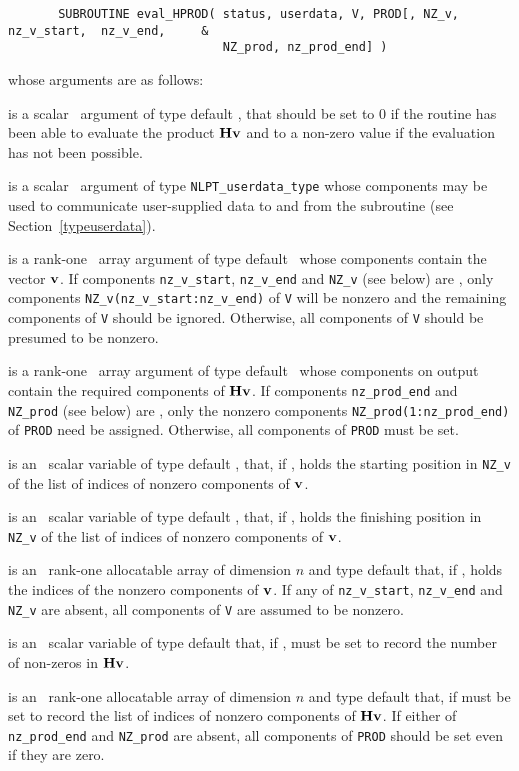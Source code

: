 \documentclass{galahad}
\begin{document}
\def\baselinestretch{0.8}
{\tt \begin{verbatim}
       SUBROUTINE eval_HPROD( status, userdata, V, PROD[, NZ_v, nz_v_start,  nz_v_end,     &
                              NZ_prod, nz_prod_end] )
\end{verbatim} }
\def\baselinestretch{1.0}
\noindent whose arguments are as follows:

\begin{description}
 is a scalar \intentout\ argument of type default \integer,
that should be set to 0 if the routine has been able to evaluate the
product ${\mathbf{H}} {\mathbf{v}}$ 
and to a non-zero value if the evaluation has not been possible.

 is a scalar \intentinout\ argument of type 
{\tt NLPT\_userdata\_type} whose components may be used
to communicate user-supplied data to and from the
subroutine (see Section~\ref{typeuserdata}). 

 is a rank-one \intentin\ array argument of type default \realdp\
whose components contain the vector ${\mathbf{v}}$. 
If components
{\tt nz\_v\_start},
{\tt nz\_v\_end} 
and
{\tt NZ\_v} 
(see below) are \present,
only components {\tt NZ\_v(nz\_v\_start:nz\_v\_end)} of {\tt V} 
will be nonzero and the remaining components of {\tt V} should be
ignored. Otherwise, all components of {\tt V} should be presumed to be nonzero.

 is a rank-one \intentout\ array argument of type default \realdp\
whose components on output contain the required components of ${\mathbf{H}} {\mathbf{v}}$.
If components
{\tt nz\_prod\_end} 
and
{\tt NZ\_prod} 
(see below) are \present, 
only the nonzero components {\tt NZ\_prod(1:nz\_prod\_end)} of {\tt PROD} 
need be assigned.
Otherwise, all components of {\tt PROD} must be set.

 is an \optional\ scalar variable of type default \integer, 
that, if \present, holds the starting position in {\tt NZ\_v}
of the list of indices of nonzero components of ${\mathbf{v}}$.

 is an \optional\ scalar variable of type default \integer, 
that, if \present, holds the finishing position in {\tt NZ\_v}
of the list of indices of nonzero components of ${\mathbf{v}}$.

 is an \optional\  rank-one allocatable array of dimension $n$
and type default \integer that, if \present, holds the indices of the
nonzero components of ${\mathbf{v}}$. If any of 
{\tt nz\_v\_start},
{\tt nz\_v\_end} 
and
{\tt NZ\_v} 
are absent, all components of {\tt V} are assumed to be nonzero.

\itt{nz\_prod\_end} is an \optional\ scalar variable of type default \integer
that, if \present, must be set to record the number of non-zeros in 
${\mathbf{H}} {\mathbf{v}}$.

 is an \optional\ rank-one allocatable array of dimension $n$
and type default \integer that, if \present must be set to record the list of
indices of nonzero components of ${\mathbf{H}} {\mathbf{v}}$. 
If either of 
{\tt nz\_prod\_end} 
and
{\tt NZ\_prod} 
are absent, all components of {\tt PROD} should be set even if they are zero.


\end{description}
\end{document}
